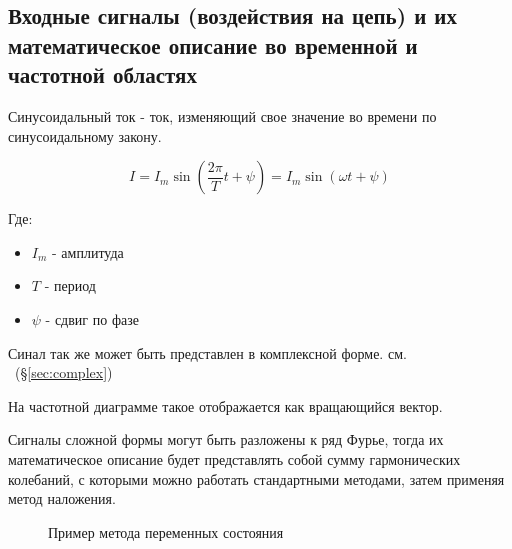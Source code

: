 \subsection{Входные сигналы (воздействия на цепь) и их математическое описание во временной и частотной областях}


Синусоидальный ток - ток, изменяющий свое значение во времени по синусоидальному закону.


\begin{equation}
I = I_m \sin(\frac{2 \pi }{T} t + \psi) = I_m \sin ( \omega t + \psi )
\end{equation}

Где:

\begin{itemize}
\item
$ I_m $  - амплитуда
\item
$ T $ - период
\item
$ \psi $ - сдвиг по фазе
\end{itemize}


Синал так же может быть представлен в комплексной форме. см. ~(\S \ref{sec:complex})

На частотной диаграмме такое отображается как вращающийся вектор.



Сигналы сложной формы могут быть разложены к ряд Фурье, тогда их математическое описание будет представлять собой сумму гармонических колебаний, с которыми можно работать стандартными методами, затем применяя метод наложения.

\begin{center}
	\begin{figure}[h!]
		\caption{Пример метода переменных состояния}	
	\end{figure}
\end{center}



\pagebreak